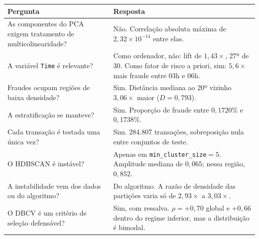 \documentclass[11pt,a4paper]{article}
\begin{document}
\begin{table}[H]
    \centering
    \small
    \begin{tabular}{p{5.4cm} p{10.2cm}}
        \toprule
        \textbf{Pergunta} & \textbf{Resposta} \\
        \midrule
        As componentes do PCA exigem tratamento de multicolinearidade? &
        Não. Correlação absoluta máxima de $2{,}32 \times 10^{-14}$ entre elas. \\
        \addlinespace
        A variável \texttt{Time} é relevante? &
        Como ordenador, não: lift de $1{,}43\times$, 27ª de 30. Como fator de
        risco a priori, sim: $5{,}6\times$ mais fraude entre 03h e 06h. \\
        \addlinespace
        Fraudes ocupam regiões de baixa densidade? &
        Sim. Distância mediana ao 20º vizinho $3{,}06\times$ maior
        ($D = 0{,}793$). \\
        \addlinespace
        A estratificação se manteve? &
        Sim. Proporção de fraude entre $0{,}1720\%$ e $0{,}1738\%$. \\
        \addlinespace
        Cada transação é testada uma única vez? &
        Sim. 284.807 transações, sobreposição nula entre conjuntos de teste. \\
        \addlinespace
        O HDBSCAN é instável? &
        Apenas em \texttt{min\_cluster\_size}${}=5$. Amplitude mediana de
        $0{,}065$; nessa região, $0{,}852$. \\
        \addlinespace
        A instabilidade vem dos dados ou do algoritmo? &
        Do algoritmo. A razão de densidade das partições varia só de
        $2{,}93\times$ a $3{,}03\times$. \\
        \addlinespace
        O DBCV é um critério de seleção defensável? &
        Sim, com ressalva. $\rho = +0{,}70$ global e $+0{,}66$ dentro do regime
        inferior, mas a distribuição é bimodal. \\
        \bottomrule
    \end{tabular}
\end{table}
\end{document}
